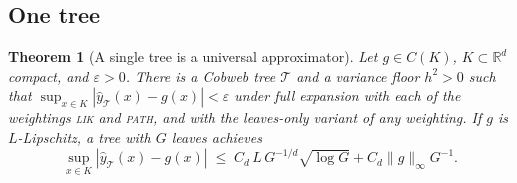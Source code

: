 \documentclass[11pt]{article}
\newtheorem{theorem}{Theorem}
\theoremstyle{definition}
\theoremstyle{remark}
\newcommand{\R}{\mathbb{R}}
\newcommand{\T}{\mathcal{T}}
\newcommand{\hy}{\hat{y}}
\begin{document}
\subsection{One tree}

\begin{theorem}[A single tree is a universal approximator]\label{thm:single}
Let $g\in C(K)$, $K\subset\R^d$ compact, and $\varepsilon>0$.  There is a Cobweb tree $\T$
and a variance floor $h^2>0$ such that $\sup_{x\in K}|\hy_\T(x)-g(x)|<\varepsilon$ under
full expansion with each of the weightings \textsc{lik} and \textsc{path}, and with the
leaves-only variant of any weighting.  If $g$ is $L$-Lipschitz, a tree with $G$ leaves
achieves
\begin{equation}\label{eq:singlerate}
  \sup_{x\in K}|\hy_\T(x)-g(x)|\;\le\;C_d\,L\,G^{-1/d}\sqrt{\log G}+C_d\|g\|_\infty G^{-1}.
\end{equation}
\end{theorem}
\end{document}
